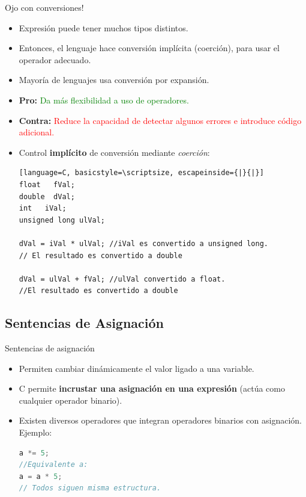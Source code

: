 \documentclass{beamer}
\begin{document}
\begin{frame}[fragile]{Ojo con conversiones!}
\small
\begin{itemize}
	\item Expresión puede tener muchos tipos distintos.
	\item Entonces, el lenguaje hace conversión implícita (coerción), para usar el operador adecuado.
	\item Mayoría de lenguajes usa conversión por expansión. 
	\item \textbf{Pro:} \textcolor{green}{Da más flexibilidad a uso de operadores.}
	\item \textbf{Contra:} \textcolor{red}{Reduce la capacidad de detectar algunos errores e introduce código adicional.}
	\item Control \textbf{implícito} de conversión mediante \emph{coerción}:
	\begin{lstlisting}[language=C, basicstyle=\scriptsize, escapeinside={|}{|}]
float   fVal;
double  dVal;
int   iVal;
unsigned long ulVal;

dVal = iVal * ulVal; //iVal es convertido a unsigned long.
// El resultado es convertido a double 

dVal = ulVal + fVal; //ulVal convertido a float.
//El resultado es convertido a double            
	\end{lstlisting}
\end{itemize}
\end{frame}

\subsection{Sentencias de Asignación}
\begin{frame}[fragile]{Sentencias de asignación}
\begin{itemize}
	\item Permiten cambiar dinámicamente el valor ligado a una variable.
	\item C permite \textbf{incrustar una asignación en una expresión} (actúa como cualquier operador binario).
	\item Existen diversos operadores que integran operadores binarios con asignación. Ejemplo:
	\begin{lstlisting}[language=C, basicstyle=\scriptsize] 
a *= 5;
//Equivalente a:
a = a * 5;
// Todos siguen misma estructura.
	\end{lstlisting} 
\end{itemize}
\end{frame}
\end{document}
